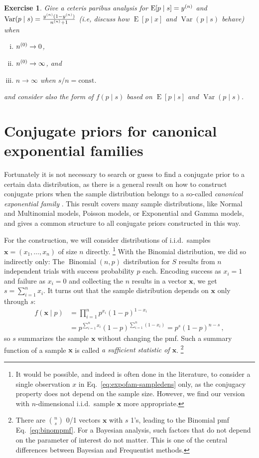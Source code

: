 \documentclass[12pt,a4paper	,twoside]{article}
\newcommand{\bs}[1]{\boldsymbol{#1}}
\renewcommand{\vec}[1]{{\bs#1}}
\newcommand{\E}{\operatorname{E}}
\newcommand{\V}{\operatorname{Var}}
\newcommand{\bin}{\operatorname{Binomial}}
\newtheorem{myex}{Exercise}
\begin{document}
\begin{myex}
Give a ceteris paribus analysis for $\E[p\mid s] = \yn$ and $\V(p\mid s) = \frac{\yn (1-\yn)}{\nn + 1}$
(i.e, discuss how $\E[p\mid x]$ and $\V(p\mid s)$ behave) when
\begin{enumerate}[(i)]
\item $n^{(0)} \to 0$,
\item $n^{(0)} \to \infty$, and
\item $n\to \infty$ when $s/n = \text{const}$.
\end{enumerate}
and consider also the form of $f(p\mid s)$ based on $\E[p\mid s]$ and $\V(p\mid s)$.
\end{myex}


\section{Conjugate priors for canonical exponential families}

Fortunately it is not necessary to search or guess to find a conjugate prior to a certain data distribution,
as there is a general result on how to construct conjugate priors
when the sample distribution belongs to a so-called \emph{canonical exponential family}
\parencite[e.g.,][pp.~202 and 272f]{2000:bernardosmith}. %
This result covers many sample distributions, %
like Normal and Multinomial models, Poisson models, or Exponential and Gamma models,
and gives a common structure to all conjugate priors constructed in this way.

For the construction, we will consider distributions of i.i.d.\ samples $\vec{x} = (x_1,\ldots,x_n)$ of size $n$ directly.%
\footnote{\label{foot:dataisplural}It would be possible, and indeed is often done in the literature,
to consider a single observation $x$ in Eq.~\eqref{eq:expofam-sampledens} only,
as the conjugacy property does not depend on the sample size.
However, we find our version with $n$-dimensional i.i.d.\ sample $\vec{x}$
more appropriate.} %
With the Binomial distribution, we did so indirectly only:
The $\bin(n,p)$ distribution for $S$ results from $n$ independent trials with success probability $p$ each.
Encoding success as $x_i=1$ and failure as $x_i=0$ and collecting the $n$ results in a vector $\vec{x}$,
we get $s =\sum_{i=1}^n x_i$.
It turns out that the sample distribution depends on $\vec{x}$ only through $s$:
\begin{align}
f(\vec{x} \mid p) &= \prod_{i=1}^n p^{x_i} (1-p)^{1-x_i} \nonumber\\
 &= p^{\sum_{i=1}^n x_i} (1-p)^{\sum_{i=1}^n (1-x_i)} = p^s (1-p)^{n-s}\,,
\end{align}
so $s$ summarizes the sample $\vec{x}$ without changing the pmf.
Such a summary function of a sample $\vec{x}$ is called \emph{a sufficient statistic of $\vec{x}$}.%
\footnote{There are $\binom{n}{s}$ 0/1 vectors $\vec{x}$ with $s$ 1's, leading to the Binomial pmf Eq.~\eqref{eq:binompmf}.
For a Bayesian analysis, such factors that do not depend on the parameter of interest do not matter.
This is one of the central differences between Bayesian and Frequentist methods.}
\end{document}
